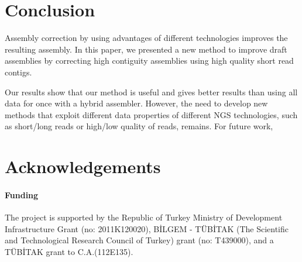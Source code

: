 \documentclass[12pt,a4paper]{cibb}
\begin{document}
\section{\bf Conclusion}

Assembly correction by using advantages of different technologies improves the resulting assembly. In this paper, we presented a new method to improve draft assemblies by correcting high contiguity assemblies using high quality short read contigs. 

Our results show that our method is useful and gives better results than using all data for once with a hybrid assembler. However, the need to develop new methods that exploit different data properties of different NGS technologies, such as short/long reads or high/low quality of reads, remains. For future work, 

\section*{\bf Acknowledgements}
\paragraph{Funding\textcolon}
The project is supported by the Republic of Turkey Ministry of Development Infrastructure Grant (no: 2011K120020), B\.{I}LGEM \-- T\"{U}B\.{I}TAK (The Scientific and Technological Research Council of Turkey) grant (no: T439000), and a T\"{U}B\.{I}TAK grant to C.A.(112E135).\\
\end{document}
